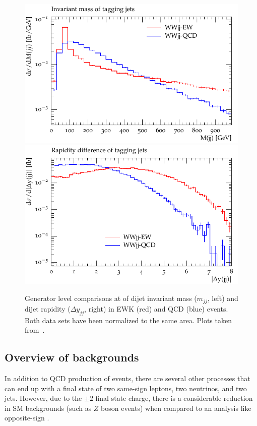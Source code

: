 \begin{figure}[htbp]
  \centering
  \includegraphics[width=.48\textwidth]{figs/ssww_13tev/introduction/Nm1_mjj}
  \includegraphics[width=.48\textwidth]{figs/ssww_13tev/introduction/Nm1_deltaY}
  \caption[Generator level comparisons at  of dijet invariant mass ($m_{jj}$, left) and dijet rapidity ($\Delta y_{jj}$, right) in EWK (red) and QCD (blue) \ssww events.  Both data sets have been normalized to the same area.]{Generator level comparisons at  of dijet invariant mass ($m_{jj}$, left) and dijet rapidity ($\Delta y_{jj}$, right) in EWK (red) and QCD (blue) \ssww events.  Both data sets have been normalized to the same area.  Plots taken from~\cite{2013.ssww-8tev-atlas-support}.}
  \label{fig:ssww13tev_dijet_comparison}
\end{figure}

\subsection{Overview of backgrounds}\label{ssww13tev:background_overview}
In addition to QCD production of \ssww events, there are several other processes that can end up with a final state of two same-sign leptons, two neutrinos, and two jets.
However, due to the $\pm 2$ final state charge, there is a considerable reduction in SM backgrounds (such as $Z$ boson events) when compared to an analysis like opposite-sign \oswwjj.

